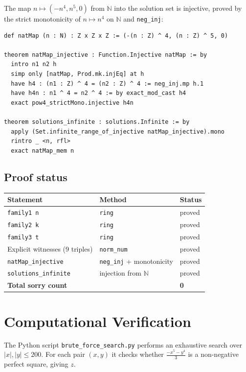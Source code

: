 \documentclass[12pt,a4paper]{article}
\theoremstyle{definition}
\newcommand{\N}{\mathbb{N}}
\begin{document}
The map $n \mapsto (-n^4, n^5, 0)$ from $\N$ into the solution set is injective,
proved by the strict monotonicity of $n \mapsto n^4$ on $\N$ and \texttt{neg\_inj}:

\begin{lstlisting}[language=Lean4]
def natMap (n : N) : Z x Z x Z := (-(n : Z) ^ 4, (n : Z) ^ 5, 0)

theorem natMap_injective : Function.Injective natMap := by
  intro n1 n2 h
  simp only [natMap, Prod.mk.injEq] at h
  have h4 : (n1 : Z) ^ 4 = (n2 : Z) ^ 4 := neg_inj.mp h.1
  have h4n : n1 ^ 4 = n2 ^ 4 := by exact_mod_cast h4
  exact pow4_strictMono.injective h4n

theorem solutions_infinite : solutions.Infinite := by
  apply (Set.infinite_range_of_injective natMap_injective).mono
  rintro _ <n, rfl>
  exact natMap_mem n
\end{lstlisting}

\subsection{Proof status}

\begin{center}
\renewcommand{\arraystretch}{1.3}
\begin{tabular}{lll}
\toprule
Statement & Method & Status \\
\midrule
\texttt{family1 n} & \texttt{ring} & proved \\
\texttt{family2 k} & \texttt{ring} & proved \\
\texttt{family3 t} & \texttt{ring} & proved \\
Explicit witnesses (9 triples) & \texttt{norm\_num} & proved \\
\texttt{natMap\_injective} & \texttt{neg\_inj} + monotonicity & proved \\
\texttt{solutions\_infinite} & injection from $\N$ & proved \\
\midrule
\textbf{Total sorry count} & & \textbf{0} \\
\bottomrule
\end{tabular}
\end{center}

\section{Computational Verification}\label{sec:computation}

The Python script \texttt{brute\_force\_search.py} performs an exhaustive search over
$|x|, |y| \leq 200$.  For each pair $(x,y)$ it checks whether
$\frac{-x^5 - y^4}{3}$ is a non-negative perfect square, giving $z$.
\end{document}
